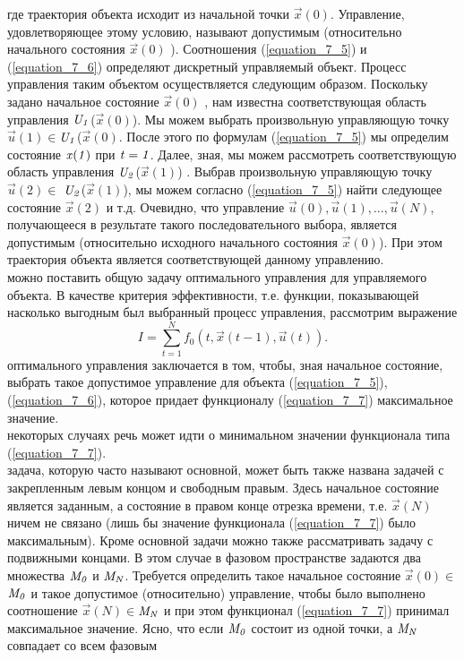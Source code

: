 где траектория объекта исходит из начальной точки $\vec{x}(0)$. Управление, удовлетворяющее этому условию, называют допустимым (относительно начального состояния $\vec{x}(0)$ ). Соотношения (\ref{equation_7_5}) и  (\ref{equation_7_6}) определяют дискретный управляемый объект. Процесс управления таким объектом осуществляется следующим образом. Поскольку задано начальное состояние $\vec{x}(0)$ , нам известна соответствующая область управления $\it U_1$($\vec{x}(0)$). Мы можем выбрать произвольную управляющую точку $\vec{u}(1)\in$$\it U_1$($\vec{x}(0)$. После этого по формулам (\ref{equation_7_5}) мы определим состояние $\it{x}(1)$ при $\it t=1$. Далее, зная, мы можем рассмотреть соответствующую область управления $\it U_2$($\vec{x}(1) $) . Выбрав произвольную управляющую точку  $\vec{u}(2)\in$ $\it U_2$($\vec{x}(1) $), мы можем согласно (\ref{equation_7_5}) найти следующее состояние $\vec{x}(2)$ и т.д. Очевидно, что управление $\vec{u}(0), \vec{u}(1),...,\vec{u}(N)$, получающееся в результате такого последовательного выбора, является допустимым (относительно исходного начального состояния $\vec{x}(0)$). При этом траектория объекта   является соответствующей данному управлению.\\
 можно поставить общую задачу оптимального управления для управляемого объекта. В качестве критерия эффективности, т.е. функции, показывающей насколько выгодным был выбранный процесс управления, рассмотрим выражение
\begin{equation}\label{equation_7_7}
I = \sum_{t=1}^Nf_0(t,\vec{x}(t-1),\vec{u}(t)).
\end{equation}
 оптимального управления  заключается в том, чтобы, зная начальное состояние, выбрать такое допустимое управление для объекта (\ref{equation_7_5}),(\ref{equation_7_6}), которое придает функционалу (\ref{equation_7_7}) максимальное значение.\\
 некоторых случаях речь может идти о  минимальном  значении функционала типа (\ref{equation_7_7}).\\
 задача, которую часто называют основной, может быть также названа задачей с закрепленным левым концом  и свободным правым. Здесь начальное состояние является заданным, а состояние в правом конце отрезка времени, т.е.  $\vec{x}(N)$ ничем не связано (лишь бы значение функционала (\ref{equation_7_7}) было максимальным). Кроме основной задачи можно также рассматривать задачу с подвижными концами. В этом случае в фазовом пространстве задаются два множества $\it M_0$ и $\it M_N$. Требуется определить такое начальное состояние $\vec{x}(0)\in$$\it M_0$ и такое допустимое (относительно) управление, чтобы было выполнено соотношение  $\vec{x}(N)\in$$\it M_N$  и при этом функционал (\ref{equation_7_7}) принимал максимальное значение. Ясно, что если $\it M_0$ состоит из одной точки, а $\it M_N$ совпадает со всем фазовым
$$
